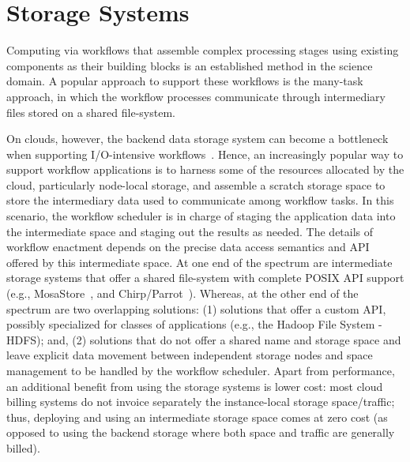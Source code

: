 \documentclass{sig-alternate}
\begin{document}
\section{Storage Systems}\label{sec:storage}


Computing via workflows that assemble complex processing stages using existing
components as their building blocks is an established method in the science
domain. A popular approach to support these workflows is the many-task
approach, in which the workflow processes communicate through intermediary
files stored on a shared file-system.

On clouds, however, the backend data storage system can become a bottleneck
when supporting I/O-intensive workflows~\cite{works-ame}. Hence, an
increasingly popular way to support workflow applications is to harness some of
the resources allocated by the cloud, particularly node-local storage, and
assemble a scratch storage space to store the intermediary data used to
communicate among workflow tasks. In this scenario,
the workflow scheduler is in charge of staging the application data into the
intermediate space and staging out the results as needed. The details of
workflow enactment depends on the precise data access semantics and API offered
by this intermediate space. At one end of the spectrum are intermediate storage
systems that offer a shared file-system with complete POSIX API support (e.g.,
MosaStore~\cite{MosaStore_2010, MosaStore_2012}, and
Chirp/Parrot~\cite{chirp}). Whereas, at the other end of the spectrum are two
overlapping solutions: (1) solutions that offer a custom API, possibly
specialized for classes of applications (e.g., the Hadoop File System - HDFS);
and, (2) solutions that do not offer a shared name and storage space and leave
explicit data movement between independent storage nodes and space management
to be handled by the workflow scheduler. Apart from performance, an additional
benefit from using the storage systems is lower cost: most cloud billing
systems do not invoice separately the instance-local storage space/traffic;
thus, deploying and using an intermediate storage space comes at zero cost (as
opposed to using the backend storage where both space and traffic are generally
billed). 
%
\end{document}
